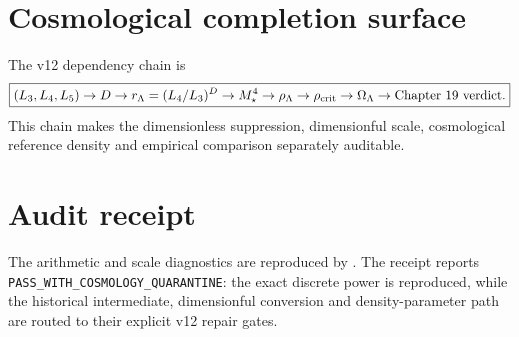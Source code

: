 \section{Cosmological completion surface}

The v12 dependency chain is
\[
\boxed{
(L_3,L_4,L_5)
\to D
\to r_\Lambda=(L_4/L_3)^D
\to M_\star^4
\to\rho_\Lambda
\to\rho_{\rm crit}
\to\Omega_\Lambda
\to\text{Chapter 19 verdict}.
}
\]
This chain makes the dimensionless suppression, dimensionful scale, cosmological reference density and empirical comparison separately auditable.

\section{Audit receipt}

The arithmetic and scale diagnostics are reproduced by
.
The receipt
reports \texttt{PASS\_WITH\_COSMOLOGY\_QUARANTINE}: the exact discrete power is reproduced, while the historical intermediate, dimensionful conversion and density-parameter path are routed to their explicit v12 repair gates.
